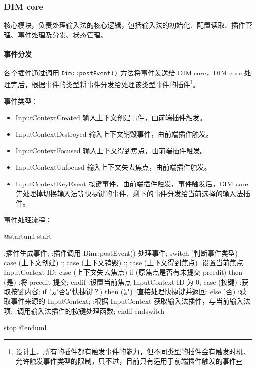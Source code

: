\documentclass{utart}
\begin{document}
        \subsubsection{DIM core}
            \par 核心模块，负责处理输入法的核心逻辑，包括输入法的初始化、配置读取、插件管理、事件处理及分发、状态管理。

            \paragraph{事件分发}
                \par 各个插件通过调用 \texttt{Dim::postEvent()} 方法将事件发送给 DIM core，DIM core 处理完后，根据事件的类型将事件分发给处理该类型事件的插件\footnote{设计上，所有的插件都有触发事件的能力，但不同类型的插件会有触发时机、允许触发事件类型的限制，只不过，目前只有适用于前端插件触发的事件}。

                \par 事件类型：
                \begin{itemize}
                    \item{InputContextCreated} 输入上下文创建事件，由前端插件触发。
                    \item{InputContextDestroyed} 输入上下文销毁事件，由前端插件触发。
                    \item{InputContextFocused} 输入上下文得到焦点，由前端插件触发。
                    \item{InputContextUnfocusd} 输入上下文失去焦点，由前端插件触发。
                    \item{InputContextKeyEvent} 按键事件，由前端插件触发，事件触发后，DIM core 先处理掉切换输入法等快捷键的事件，剩下的事件分发给当前选择的输入法插件。
                \end{itemize}

                \par 事件处理流程：

                \begin{plantuml}
                @startuml
                start

                :插件生成事件;
                :插件调用 Dim::postEvent() 处理事件;
                switch (判断事件类型)
                case (上下文创建)
                    :;
                case (上下文销毁)
                    :;
                case (上下文得到焦点)
                    :设置当前焦点 InputContext ID;
                case (上下文失去焦点)
                    if (原焦点是否有未提交 preedit) then (是)
                        :将 preedit 提交;
                    endif
                    :设置当前焦点 InputContext ID 为 0;
                case (按键)
                    :获取按键内容;
                    if (是否是快捷键？) then (是)
                        :直接处理快捷键并返回;
                    else (否)
                        :获取事件来源的 InputContext;
                        :根据 InputContext 获取输入法插件，与当前输入法项;
                        :调用输入法插件的按键处理函数;
                    endif
                endswitch

                stop
                @enduml
                \end{plantuml}
\end{document}
